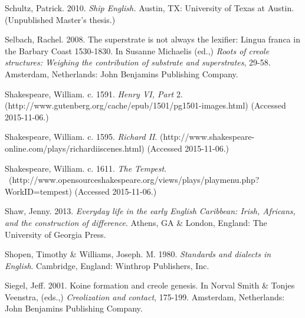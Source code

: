 \begin{styleStandard}
Schultz, Patrick. 2010. \textit{Ship English.} Austin, TX: University of Texas at Austin. (Unpublished Master’s thesis.) 
\end{styleStandard}

\begin{styleStandard}
Selbach, Rachel. 2008. The superstrate is not always the lexifier: Lingua franca in the Barbary Coast 1530-1830. In Susanne Michaelis (ed.,) \textit{Roots of creole structures: Weighing the contribution of substrate and superstrates}, 29-58. Amsterdam, Netherlands: John Benjamins Publishing Company.
\end{styleStandard}

\begin{styleStandard}
Shakespeare, William. c. 1591. \textit{Henry VI, Part} 2. (http://www.gutenberg.org/cache/epub/1501/pg1501-images.html) (Accessed 2015-11-06.)
\end{styleStandard}

\begin{styleStandard}
Shakespeare, William. c. 1595. \textit{Richard II}. (http://www.shakespeare-online.com/plays/richardiiscenes.html) (Accessed 2015-11-06.)
\end{styleStandard}

\begin{styleStandard}
Shakespeare, William. c. 1611. \textit{The Tempest}. \ (http://www.opensourceshakespeare.org/views/plays/playmenu.php?WorkID=tempest) (Accessed 2015-11-06.)
\end{styleStandard}

\begin{styleStandard}
Shaw, Jenny. 2013. \textit{Everyday life in the early English Caribbean: Irish, Africans, and the construction of difference}. Athens, GA \& London, England: The University of Georgia Press.
\end{styleStandard}

\begin{styleStandard}
Shopen, Timothy \& Williams, Joseph. M. 1980. \textit{Standards and dialects in English}. Cambridge, England: Winthrop Publishers, Inc.
\end{styleStandard}

\begin{styleStandard}
Siegel, Jeff. 2001. Koine formation and creole genesis. In Norval Smith \& Tonjes Veenstra, (eds.,) \textit{Creolization and contact}, 175-199. Amsterdam, Netherlands: John Benjamins Publishing Company.
\end{styleStandard}

